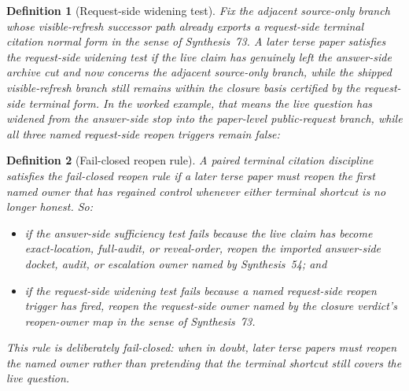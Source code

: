 \documentclass[11pt]{article}
\newtheorem{definition}{Definition}
\begin{document}
\begin{definition}[Request-side widening test]
Fix the adjacent source-only branch whose visible-refresh successor path already exports a request-side terminal citation normal form in the sense of Synthesis~73.
A later terse paper satisfies the \emph{request-side widening test} if the live claim has genuinely left the answer-side archive cut and now concerns the adjacent source-only branch, while the shipped visible-refresh branch still remains within the closure basis certified by the request-side terminal form.
In the worked example, that means the live question has widened from the answer-side stop into the paper-level public-request branch, while all three named request-side reopen triggers remain false:
\begin{quote}\small
{}\par
{}\par
{}
\end{quote}
\end{definition}

\begin{definition}[Fail-closed reopen rule]
A paired terminal citation discipline satisfies the \emph{fail-closed reopen rule} if a later terse paper must reopen the first named owner that has regained control whenever either terminal shortcut is no longer honest.
So:
\begin{itemize}[leftmargin=2em]
    \item if the answer-side sufficiency test fails because the live claim has become \textsf{exact-location}, \textsf{full-audit}, or \textsf{reveal-order}, reopen the imported answer-side docket, audit, or escalation owner named by Synthesis~54; and
    \item if the request-side widening test fails because a named request-side reopen trigger has fired, reopen the request-side owner named by the closure verdict's reopen-owner map in the sense of Synthesis~73.
\end{itemize}
This rule is deliberately fail-closed: when in doubt, later terse papers must reopen the named owner rather than pretending that the terminal shortcut still covers the live question.
\end{definition}
\end{document}
